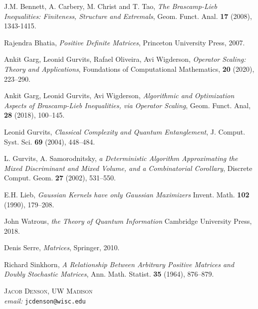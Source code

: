 \documentclass[12pt]{article}
\begin{document}
\begin{thebibliography}{3}

    J.M. Bennett, A. Carbery, M. Christ and T. Tao,
    \emph{The {B}rascamp-{L}ieb Inequalities: Finiteness, Structure and Extremals},
    Geom. Funct. Anal. {\bf 17} (2008), 1343-1415.

    Rajendra Bhatia,
    \emph{Positive Definite Matrices},
    Princeton University Press, 2007.

    Ankit Garg, Leonid Gurvits, Rafael Oliveira, Avi Wigderson,
    \emph{Operator Scaling: Theory and Applications},
    Foundations of Computational Mathematics, {\bf 20} (2020), 223--290.

    Ankit Garg, Leonid Gurvits, Avi Wigderson,
    \emph{Algorithmic and Optimization Aspects of {B}rascamp-{L}ieb Inequalities, via Operator Scaling},
    Geom. Funct. Anal, {\bf 28} (2018), 100--145.

    Leonid Gurvits,
    \emph{Classical Complexity and Quantum Entanglement},
    J. Comput. Syst. Sci. {\bf 69} (2004), 448--484.

    L. Gurvits, A. Samorodnitsky,
    \emph{a Deterministic Algorithm Approximating the Mixed Discriminant and Mixed Volume, and a Combinatorial Corollary},
    Discrete Comput. Geom. {\bf 27} (2002), 531--550.

    E.H. Lieb,
    \emph{{G}aussian Kernels have only {G}aussian Maximizers}
    Invent. Math. {\bf 102} (1990), 179--208.

    John Watrous,
    \emph{the Theory of Quantum Information}
    Cambridge University Press, 2018.

    Denis Serre,
    \emph{Matrices},
    Springer, 2010.

    Richard Sinkhorn,
    \emph{A Relationship Between Arbitrary Positive Matrices and Doubly Stochastic Matrices},
    Ann. Math. Statist. {\bf 35} (1964), 876--879.

\end{thebibliography}

\noindent \textsc{Jacob Denson, UW Madison}\\
\textit{email:} \texttt{jcdenson@wisc.edu}
\end{document}
